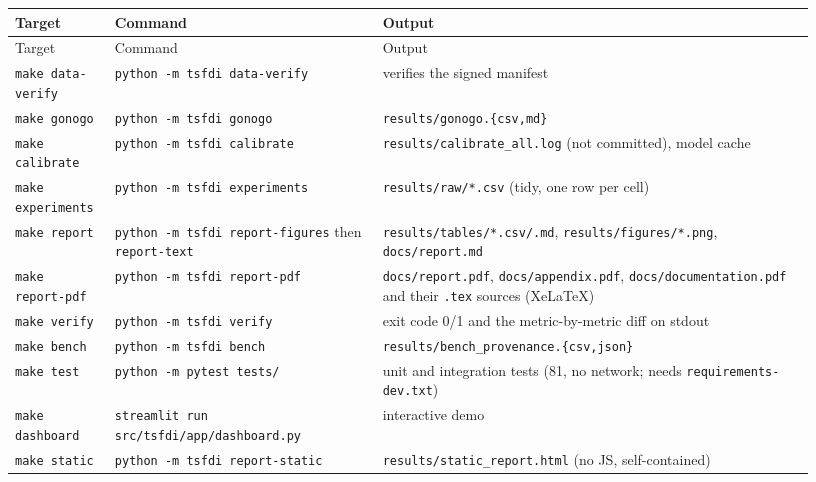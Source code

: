 \documentclass[10pt,a4paper]{article}
\begin{document}
{\small
\setlength{\tabcolsep}{4.5pt}
\setlength{\LTleft}{\fill}
\setlength{\LTright}{\fill}
\begin{longtable}{>{\raggedright\arraybackslash}p{0.115\linewidth}>{\raggedright\arraybackslash}p{0.313\linewidth}>{\raggedright\arraybackslash}p{0.506\linewidth}}
\toprule
Target & Command & Output \\
\midrule
\endfirsthead
\toprule
Target & Command & Output \\
\midrule
\endhead
\bottomrule
\endlastfoot
\texttt{make data-\allowbreak{}verify} & \texttt{python -\allowbreak{}m tsfdi data-\allowbreak{}verify} & verifies the signed manifest \\
\texttt{make gonogo} & \texttt{python -\allowbreak{}m tsfdi gonogo} & \texttt{results/\allowbreak{}gonogo.\{csv,md\}} \\
\texttt{make calibrate} & \texttt{python -\allowbreak{}m tsfdi calibrate} & \texttt{results/\allowbreak{}calibrate\_\allowbreak{}all.log} (not committed), model cache \\
\texttt{make experiments} & \texttt{python -\allowbreak{}m tsfdi experiments} & \texttt{results/\allowbreak{}raw/\allowbreak{}*.csv} (tidy, one row per cell) \\
\texttt{make report} & \texttt{python -\allowbreak{}m tsfdi report-\allowbreak{}figures} then \texttt{report-\allowbreak{}text} & \texttt{results/\allowbreak{}tables/\allowbreak{}*.csv/\allowbreak{}.md}, \texttt{results/\allowbreak{}figures/\allowbreak{}*.png}, \texttt{docs/\allowbreak{}report.md} \\
\texttt{make report-\allowbreak{}pdf} & \texttt{python -\allowbreak{}m tsfdi report-\allowbreak{}pdf} & \texttt{docs/\allowbreak{}report.pdf}, \texttt{docs/\allowbreak{}appendix.pdf}, \texttt{docs/\allowbreak{}documentation.pdf} and their \texttt{.tex} sources (XeLaTeX) \\
\texttt{make verify} & \texttt{python -\allowbreak{}m tsfdi verify} & exit code 0/\allowbreak{}1 and the metric-\allowbreak{}by-\allowbreak{}metric diff on stdout \\
\texttt{make bench} & \texttt{python -\allowbreak{}m tsfdi bench} & \texttt{results/\allowbreak{}bench\_\allowbreak{}provenance.\{csv,json\}} \\
\texttt{make test} & \texttt{python -\allowbreak{}m pytest tests/\allowbreak{}} & unit and integration tests (81, no network; needs \texttt{requirements-\allowbreak{}dev.txt}) \\
\texttt{make dashboard} & \texttt{streamlit run src/\allowbreak{}tsfdi/\allowbreak{}app/\allowbreak{}dashboard.py} & interactive demo \\
\texttt{make static} & \texttt{python -\allowbreak{}m tsfdi report-\allowbreak{}static} & \texttt{results/\allowbreak{}static\_\allowbreak{}report.html} (no JS, self-\allowbreak{}contained) \\
\end{longtable}
}
\end{document}
